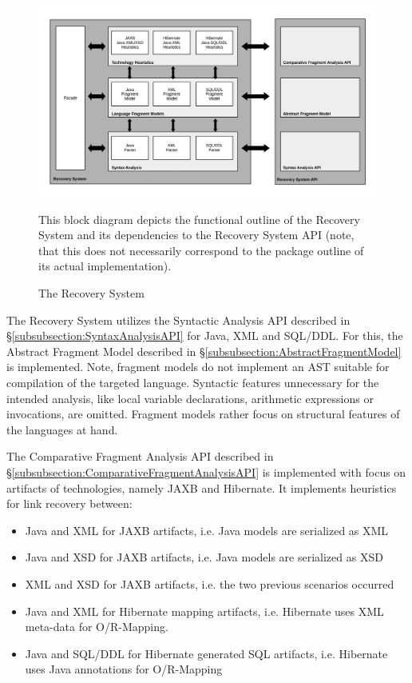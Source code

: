 \begin{figure}[h!]
\begin{center}
\includegraphics[width=\textwidth]{images/RecoverySystem.png}
\end{center}
{
\scriptsize
This block diagram depicts the functional outline of the Recovery System and its dependencies to the Recovery System \gls{API} (note, that this does not necessarily correspond to the package outline of its actual implementation).
}
\caption{The Recovery System}
\label{figure:RecoverySystem}
\end{figure}

The Recovery System utilizes the Syntactic Analysis \gls{API} described in §\ref{subsubsection:SyntaxAnalysisAPI} for \gls{Java}, \gls{XML} and \gls{SQL/DDL}.
For this, the Abstract Fragment Model described in §\ref{subsubsection:AbstractFragmentModel} is implemented.
Note, fragment models do not implement an \gls{AST} suitable for compilation of the targeted language.
Syntactic features unnecessary for the intended analysis, like local variable declarations, arithmetic expressions or invocations, are omitted.
Fragment models rather focus on structural features of the languages at hand.

The Comparative Fragment Analysis \gls{API} described in §\ref{subsubsection:ComparativeFragmentAnalysisAPI} is implemented with focus on artifacts of technologies, namely \gls{JAXB} and \gls{Hibernate}.
It implements heuristics for link recovery between:
\begin{itemize}
\item
\gls{Java} and \gls{XML} for \gls{JAXB} artifacts, i.e. \gls{Java} models are serialized as \gls{XML}
\item
\gls{Java} and \gls{XSD} for \gls{JAXB} artifacts, i.e. \gls{Java} models are serialized as \gls{XSD}
\item
\gls{XML} and \gls{XSD} for \gls{JAXB} artifacts, i.e. the two previous scenarios occurred
\item
\gls{Java} and \gls{XML} for \gls{Hibernate} mapping artifacts, i.e. \gls{Hibernate} uses \gls{XML} meta-data for \gls{O/R-Mapping}.
\item
\gls{Java} and \gls{SQL/DDL} for \gls{Hibernate} generated \gls{SQL} artifacts, i.e. \gls{Hibernate} uses \gls{Java} annotations for \gls{O/R-Mapping}
\end{itemize}


